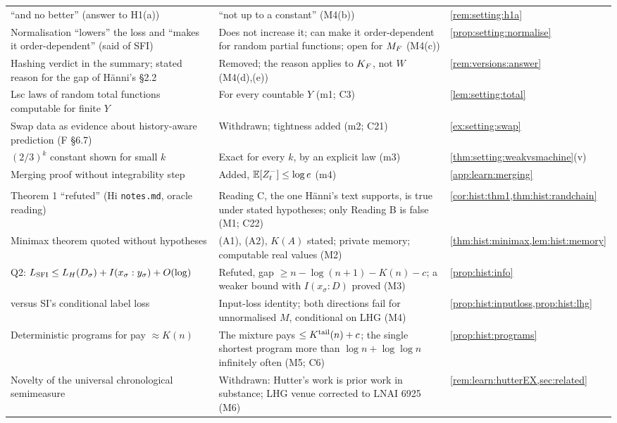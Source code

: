 {\begin{longtable}{@{}>{\raggedright\arraybackslash}p{5.1cm}>{\raggedright\arraybackslash}p{7.6cm}>{\raggedright\arraybackslash}p{2.6cm}@{}}
``and no better'' (answer to H1(a)) & ``not up to a constant'' (M4(b)) & \cref{rem:setting:h1a}\\
Normalisation ``lowers'' the loss and ``makes it order-dependent'' (said of SFI) & Does not increase it; can make it order-dependent for random partial functions; open for $M_{F}$ (M4(c)) & \cref{prop:setting:normalise}\\
Hashing verdict in the summary; stated reason for the gap of H\"anni's \S2.2 & Removed; the reason applies to $K_{F}$, not $W$ (M4(d),(e)) & \cref{rem:versions:answer}\\
Lsc laws of random total functions computable for finite $Y$ & For every countable $Y$ (m1; C3) & \cref{lem:setting:total}\\
Swap data as evidence about history-aware prediction (F \S6.7) & Withdrawn; tightness added (m2; C21) & \cref{ex:setting:swap}\\
$(2/3)^k$ constant shown for small $k$ & Exact for every $k$, by an explicit law (m3) & \cref{thm:setting:weakvsmachine}(v)\\
Merging proof without integrability step & Added, $\mathbb{E}[Z_t^-]\le\log e$ (m4) & \cref{app:learn:merging}\\
\multicolumn{3}{@{}l}{\emph{History}}\\
Theorem 1 ``refuted'' (Hi \texttt{notes.md}, oracle reading) & Reading C, the one H\"anni's text supports, is true under stated hypotheses; only Reading B is false (M1; C22) & \cref{cor:hist:thm1,thm:hist:randchain}\\
Minimax theorem quoted without hypotheses & (A1), (A2), $K(A)$ stated; private memory; computable real values (M2) & \cref{thm:hist:minimax,lem:hist:memory}\\
Q2: $L_{\mathrm{SFI}}\le L_{H}(D_\sigma)+I(x_\sigma:y_\sigma)+O(\log)$ & Refuted, gap $\ge n-\log(n+1)-K(n)-c$; a weaker bound with $I(x_\sigma:D)$ proved (M3) & \cref{prop:hist:info}\\
\SFIhist{} versus SI's conditional label loss & Input-loss identity; both directions fail for unnormalised $M$, conditional on LHG (M4) & \cref{prop:hist:inputloss,prop:hist:lhg}\\
Deterministic programs for \SFIhist{} pay $\approx K(n)$ & The mixture pays $\le K^{\mathrm{tail}}(n)+c$; the single shortest program more than $\log n+\log\log n$ infinitely often (M5; C6) & \cref{prop:hist:programs}\\
Novelty of the universal chronological semimeasure & Withdrawn: Hutter's work is prior work in substance; LHG venue corrected to LNAI 6925 (M6) & \cref{rem:learn:hutterEX,sec:related}\\

\end{longtable}}
